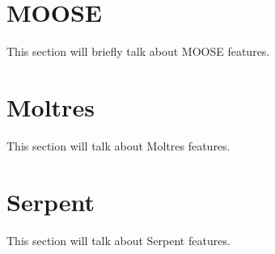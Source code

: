 \section{MOOSE}

This section will briefly talk about MOOSE features.

\section{Moltres}

This section will talk about Moltres features.

\section{Serpent}

This section will talk about Serpent features.

